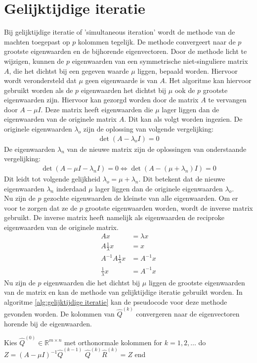 \documentclass[a4paper, 12pt, titlepage, fleqn]{article}
\begin{document}
\section{Gelijktijdige iteratie}
Bij gelijktijdige iteratie of 'simultaneous iteration' wordt de methode van de machten toegepast op $p$ kolommen tegelijk. De methode convergeert naar de $p$ grootste eigenwaarden en de bijhorende eigenvectoren. Door de methode licht te wijzigen, kunnen de $p$ eigenwaarden van een symmetrische niet-singuliere matrix $A$, die het dichtst bij een gegeven waarde $\mu$ liggen, bepaald worden. Hiervoor wordt verondersteld dat $\mu$ geen eigenwaarde is van $A$. Het algoritme kan hiervoor gebruikt worden als de $p$ eigenwaarden het dichtst bij $\mu$ ook de $p$ grootste eigenwaarden zijn. Hiervoor kan gezorgd worden door de matrix $A$ te vervangen door $A - \mu I$. Deze matrix heeft eigenwaarden die $\mu$ lager liggen dan de eigenwaarden van de originele matrix $A$. Dit kan als volgt worden ingezien. De originele eigenwaarden $\lambda_o$ zijn de oplossing van volgende vergelijking:
\begin{align*}
\det (A-\lambda_o I) = 0
\end{align*}
De eigenwaarden $\lambda_n$ van de nieuwe matrix zijn de oplossingen van onderstaande vergelijking:
\begin{align*}
\det (A - \mu I - \lambda_n I) = 0 \Leftrightarrow \det(A -(\mu + \lambda_n)I) = 0
\end{align*}
Dit leidt tot volgende gelijkheid $\lambda_o = \mu + \lambda_n$. Dit betekent dat de nieuwe eigenwaarden $\lambda_n$ inderdaad $\mu$ lager liggen dan de originele eigenwaarden $\lambda_o$.\\
Nu zijn de $p$ gezochte eigenwaarden de kleinste van alle eigenwaarden. Om er voor te zorgen dat ze de $p$ grootste eigenwaarden worden, wordt de inverse matrix gebruikt. De inverse matrix heeft namelijk als eigenwaarden de reciproke eigenwaarden van de originele matrix.
\begin{align*}
Ax &= \lambda x\\
A\frac{1}{\lambda}x &= x\\
A^{-1}A\frac{1}{\lambda}x &= A^{-1}x\\
\frac{1}{\lambda}x &= A^{-1}x
\end{align*}
Nu zijn de $p$ eigenwaarden die het dichtst bij $\mu$ liggen de grootste eigenwaarden van de matrix en kan de methode van gelijktijdige iteratie gebruikt worden. In algoritme \ref{alg:gelijktijdige iteratie} kan de pseudocode voor deze methode gevonden worden. De kolommen van $\hat{Q}^{(k)}$ convergeren naar de eigenvectoren horende bij de eigenwaarden.

\begin{algorithm}[caption={Gelijktijdige iteratie}, label={alg:gelijktijdige iteratie}]
Kies $\hat{Q}^{(0)} \in \mathbb{R}^{m\times n}$ met orthonormale kolommen
for $k = 1,2,\ldots$ do
	$Z = (A-\mu I)^{-1}\hat{Q}^{(k-1)}$
	$\hat{Q}^{(k)}\hat{R}^{(k)} = Z$
end
\end{algorithm}
\end{document}
